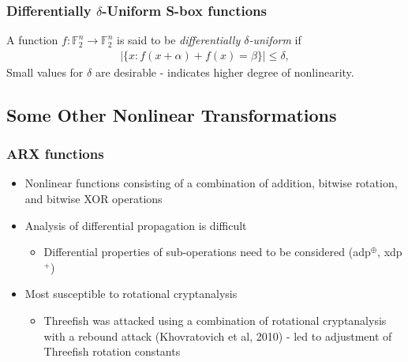 \documentclass[handout]{beamer}
\newcommand{\field}[1]{\mathbb{#1}} %
\begin{document}
\begin{frame}
	\frametitle{Differentially $\delta$-Uniform S-box functions}
	A function $f : \field{F}_2^n \to \field{F}_2^n$ is said to be \emph{differentially $\delta$-uniform} if
	\begin{eqnarray*}
		|\{x : f(x + \alpha) + f(x) = \beta\}| \leq \delta,
	\end{eqnarray*}
	Small values for $\delta$ are desirable - indicates higher degree of nonlinearity.
\end{frame}

\subsection{Some Other Nonlinear Transformations}
\begin{frame}
	\frametitle{ARX functions}
	\begin{itemize}
		\item Nonlinear functions consisting of a combination of addition, bitwise rotation, and bitwise XOR operations
		\item Analysis of differential propagation is difficult
		\begin{itemize}
			\item Differential properties of sub-operations need to be considered (adp$^{\oplus}$, xdp$^{+}$)
		\end{itemize}
		\item Most susceptible to rotational cryptanalysis
		\begin{itemize}
			\item Threefish was attacked using a combination of rotational cryptanalysis with a rebound attack (Khovratovich et al, 2010) - led to adjustment of Threefish rotation constants %
		\end{itemize}
	\end{itemize}
\end{frame}

\end{document}
